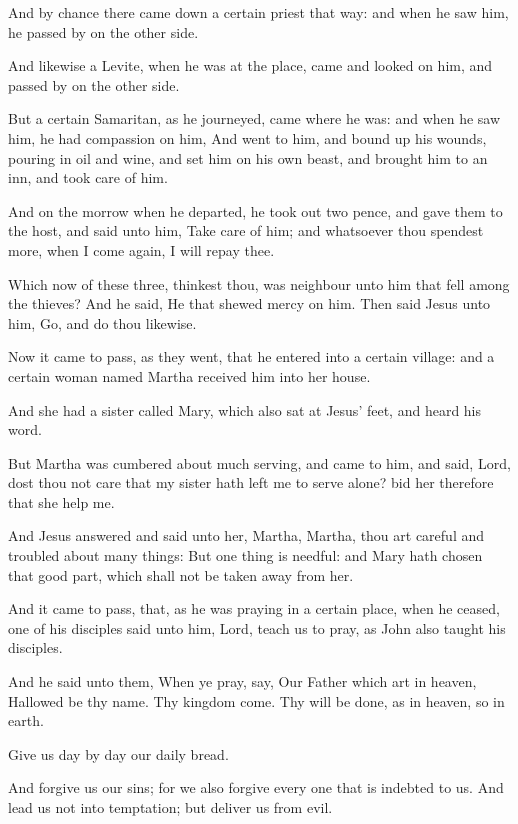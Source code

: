 \Verse And by chance there came down a certain priest that way: and when he saw him, he passed by on the other side.

\Verse And likewise a Levite, when he was at the place, came and looked on him, and passed by on the other side.

\Verse But a certain Samaritan, as he journeyed, came where he was: and when he saw him, he had compassion on him, \Verse And went to him, and bound up his wounds, pouring in oil and wine, and set him on his own beast, and brought him to an inn, and took care of him.

\Verse And on the morrow when he departed, he took out two pence, and gave them to the host, and said unto him, Take care of him; and whatsoever thou spendest more, when I come again, I will repay thee.

\Verse Which now of these three, thinkest thou, was neighbour unto him that fell among the thieves?  \Verse And he said, He that shewed mercy on him. Then said Jesus unto him, Go, and do thou likewise.

\Verse Now it came to pass, as they went, that he entered into a certain village: and a certain woman named Martha received him into her house.

\Verse And she had a sister called Mary, which also sat at Jesus' feet, and heard his word.

\Verse But Martha was cumbered about much serving, and came to him, and said, Lord, dost thou not care that my sister hath left me to serve alone?  bid her therefore that she help me.

\Verse And Jesus answered and said unto her, Martha, Martha, thou art careful and troubled about many things: \Verse But one thing is needful: and Mary hath chosen that good part, which shall not be taken away from her.


\Chapter
\Verse And it came to pass, that, as he was praying in a certain place, when he ceased, one of his disciples said unto him, Lord, teach us to pray, as John also taught his disciples.

\Verse And he said unto them, When ye pray, say, Our Father which art in heaven, Hallowed be thy name. Thy kingdom come. Thy will be done, as in heaven, so in earth.

\Verse Give us day by day our daily bread.

\Verse And forgive us our sins; for we also forgive every one that is indebted to us. And lead us not into temptation; but deliver us from evil.


